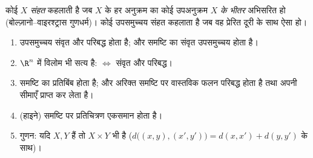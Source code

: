 \begin{definition}\label{def:b2:metric:compact}
कोई  $X$ \emph{संहत} कहलाती है जब
$X$ के हर अनुक्रम का कोई उपअनुक्रम $X$ \emph{के भीतर} अभिसरित हो
(बोल्ज़ानो--वाइरश्ट्रास गुणधर्म)। कोई उपसमुच्चय संहत कहलाता है जब वह
प्रेरित दूरी के साथ ऐसा हो।
\end{definition}

\begin{theorem}\label{thm:b2:metric:compactprops}
\begin{enumerate}
  \item {} उपसमुच्चय संवृत और परिबद्ध होता है; और  समष्टि का
        संवृत उपसमुच्चय  होता है।
  \item $\R^n$ में विलोम भी सत्य है:  $\iff$ संवृत और परिबद्ध।
  \item {} समष्टि का  प्रतिबिंब  होता है; और अरिक्त 
        समष्टि पर  वास्तविक फलन परिबद्ध होता है तथा अपनी सीमाएँ
        प्राप्त कर लेता है।
  \item (हाइने)  समष्टि पर  प्रतिचित्रण एकसमान  होता है।
  \item गुणन: यदि $X, Y$  हैं तो $X \times Y$ भी  है ($d\bigl((x,y),(x',y')\bigr) = d(x,x') + d(y,y')$ के साथ)।
\end{enumerate}
\end{theorem}

